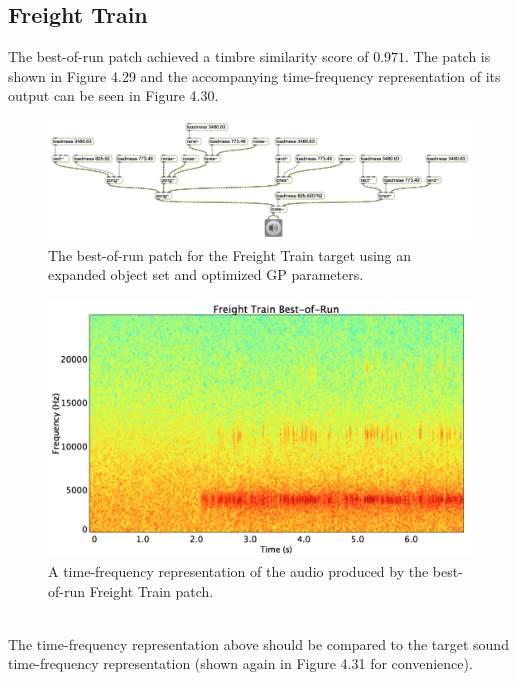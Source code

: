 \documentclass[a4paper,12pt]{report} 	%
\numberwithin{figure}{chapter}
\numberwithin{table}{chapter}
\numberwithin{equation}{chapter}
\begin{document}
\begin{flushleft}
\clearpage
\subsection{Freight Train}

The best-of-run patch achieved a timbre similarity score of $0.971$. The patch is shown in Figure 4.29 and the accompanying time-frequency representation of its output can be seen in Figure 4.30.

\begin{figure}[h!]
\begin{center}
\includegraphics[angle=270, scale=0.50]{FreightTrain_Best}
\caption[Freight Train Best-of-Run Patch]{The best-of-run patch for the Freight Train target using an expanded object set and optimized GP parameters.}
\end{center}
\end{figure}
\begin{figure}[h!]
\begin{center}
\includegraphics[scale=0.35,width=\linewidth]{FreightTrainBestOfRunSTFT}
\caption[Best-of-Run Freight Train Time-Frequency Representation]{A time-frequency representation of the audio produced by the best-of-run Freight Train patch.}
\end{center}
\end{figure}
\\
The time-frequency representation above should be compared to the target sound time-frequency representation (shown again in Figure 4.31 for convenience).

\end{flushleft}
\end{document}
